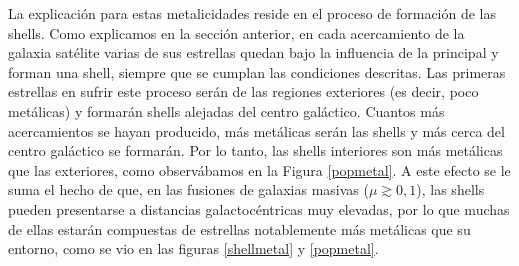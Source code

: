 La explicación para estas metalicidades reside en el proceso de formación de las shells. Como explicamos en la sección anterior, en cada acercamiento de la galaxia satélite varias de sus estrellas quedan bajo la influencia de la principal y forman una shell, siempre que se cumplan las condiciones descritas. Las primeras estrellas en sufrir este proceso serán de las regiones exteriores (es decir, poco metálicas) y formarán shells alejadas del centro galáctico. Cuantos más acercamientos se hayan producido, más metálicas serán las shells y más cerca del centro galáctico se formarán. Por lo tanto, las shells interiores son más metálicas que las exteriores, como observábamos en la Figura \ref{popmetal}. A este efecto se le suma el hecho de que, en las fusiones de galaxias masivas (\(\mu \gtrsim 0,1\)), las shells pueden presentarse a distancias galactocéntricas muy elevadas, por lo que muchas de ellas estarán compuestas de estrellas notablemente más metálicas que su entorno, como se vio en las figuras \ref{shellmetal} y \ref{popmetal}.
